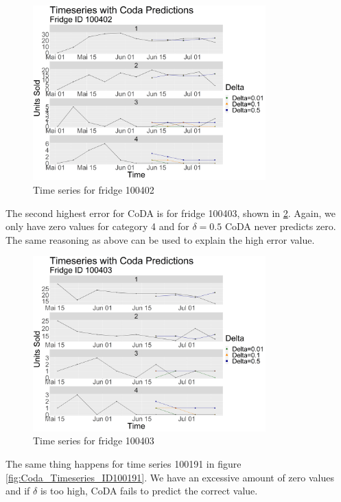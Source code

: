 \begin{figure}[htbp]
	\centering
		\includegraphics[width=0.80\textwidth]{Graphiken/Coda_Timeseries_VariationdL100402.png}
	\caption{Time series for fridge 100402}
	\label{fig:Coda_Timeseries_ID100402}
\end{figure}

The second highest error for CoDA is for fridge 100403, shown in \ref{fig:Coda_Timeseries_ID100403}. Again, we only have zero values for category 4 and for $\delta=0.5$ CoDA never predicts zero. The same reasoning as above can be used to explain the high error value. 

\begin{figure}[htbp]
	\centering
		\includegraphics[width=0.80\textwidth]{Graphiken/Coda_Timeseries_VariationdL100403.png}
	\caption{Time series for fridge 100403}
	\label{fig:Coda_Timeseries_ID100403}
\end{figure}

The same thing happens for time series 100191 in figure \ref{fig:Coda_Timeseries_ID100191}. We have an excessive amount of zero values and if $\delta$ is too high, CoDA fails to predict the correct value. 

